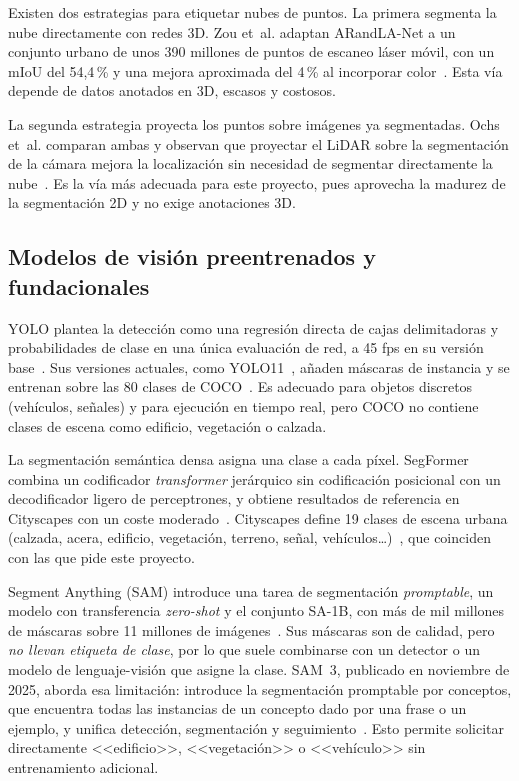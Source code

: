 \documentclass[11pt, twoside]{article}
\begin{document}
Existen dos estrategias para etiquetar nubes de puntos. La primera segmenta la nube directamente con redes 3D. Zou et~al. adaptan ARandLA-Net a un conjunto urbano de unos 390 millones de puntos de escaneo láser móvil, con un mIoU del 54,4\,\% y una mejora aproximada del 4\,\% al incorporar color~\cite{zou2021towards}. Esta vía depende de datos anotados en 3D, escasos y costosos.

La segunda estrategia proyecta los puntos sobre imágenes ya segmentadas. Ochs et~al. comparan ambas y observan que proyectar el LiDAR sobre la segmentación de la cámara mejora la localización sin necesidad de segmentar directamente la nube~\cite{ochs2025boosting}. Es la vía más adecuada para este proyecto, pues aprovecha la madurez de la segmentación 2D y no exige anotaciones 3D.

\subsection{Modelos de visión preentrenados y fundacionales}

YOLO plantea la detección como una regresión directa de cajas delimitadoras y probabilidades de clase en una única evaluación de red, a 45 fps en su versión base~\cite{redmon2016yolo}. Sus versiones actuales, como YOLO11~\cite{jocher2024yolo11}, añaden máscaras de instancia y se entrenan sobre las 80 clases de COCO~\cite{lin2014coco}. Es adecuado para objetos discretos (vehículos, señales) y para ejecución en tiempo real, pero COCO no contiene clases de escena como edificio, vegetación o calzada.

La segmentación semántica densa asigna una clase a cada píxel. SegFormer combina un codificador \emph{transformer} jerárquico sin codificación posicional con un decodificador ligero de perceptrones, y obtiene resultados de referencia en Cityscapes con un coste moderado~\cite{xie2021segformer}. Cityscapes define 19 clases de escena urbana (calzada, acera, edificio, vegetación, terreno, señal, vehículos\ldots)~\cite{cordts2016cityscapes}, que coinciden con las que pide este proyecto.

Segment Anything (SAM) introduce una tarea de segmentación \emph{promptable}, un modelo con transferencia \emph{zero-shot} y el conjunto SA-1B, con más de mil millones de máscaras sobre 11 millones de imágenes~\cite{kirillov2023sam}. Sus máscaras son de calidad, pero \emph{no llevan etiqueta de clase}, por lo que suele combinarse con un detector o un modelo de lenguaje-visión que asigne la clase. SAM~3, publicado en noviembre de 2025, aborda esa limitación: introduce la segmentación promptable por conceptos, que encuentra todas las instancias de un concepto dado por una frase o un ejemplo, y unifica detección, segmentación y seguimiento~\cite{carion2025sam3}. Esto permite solicitar directamente <<edificio>>, <<vegetación>> o <<vehículo>> sin entrenamiento adicional.
\end{document}
